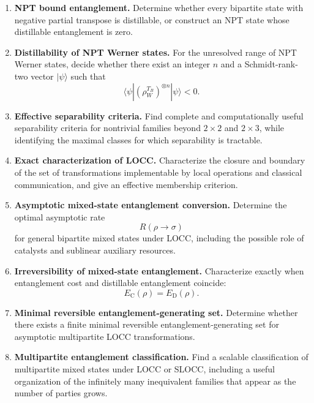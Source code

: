\documentclass{article}
\begin{document}
\begin{enumerate}[label=\textbf{E\arabic*.},leftmargin=*]

\item \precise{} \textbf{NPT bound entanglement.}
Determine whether every bipartite state with negative partial transpose
is distillable, or construct an NPT state whose distillable
entanglement is zero.

\item \precise{} \textbf{Distillability of NPT Werner states.}
For the unresolved range of NPT Werner states, decide whether there
exist an integer \(n\) and a Schmidt-rank-two vector
\(\lvert\psi\rangle\) such that
\[
 \langle\psi|(\rho_W^{T_B})^{\otimes n}|\psi\rangle<0 .
\]

\item \precise{} \textbf{Effective separability criteria.}
Find complete and computationally useful separability criteria for
nontrivial families beyond \(2\times2\) and \(2\times3\), while
identifying the maximal classes for which separability is tractable.

\item \precise{} \textbf{Exact characterization of LOCC.}
Characterize the closure and boundary of the set of transformations
implementable by local operations and classical communication, and
give an effective membership criterion.

\item \precise{} \textbf{Asymptotic mixed-state entanglement conversion.}
Determine the optimal asymptotic rate
\[
    R(\rho\to\sigma)
\]
for general bipartite mixed states under LOCC, including the possible
role of catalysts and sublinear auxiliary resources.

\item \precise{} \textbf{Irreversibility of mixed-state entanglement.}
Characterize exactly when entanglement cost and distillable
entanglement coincide:
\[
    E_{\mathrm C}(\rho)=E_{\mathrm D}(\rho).
\]

\item \precise{} \textbf{Minimal reversible entanglement-generating set.}
Determine whether there exists a finite minimal reversible
entanglement-generating set for asymptotic multipartite LOCC
transformations.

\item \precise{} \textbf{Multipartite entanglement classification.}
Find a scalable classification of multipartite mixed states under LOCC
or SLOCC, including a useful organization of the infinitely many
inequivalent families that appear as the number of parties grows.


\end{enumerate}
\end{document}
